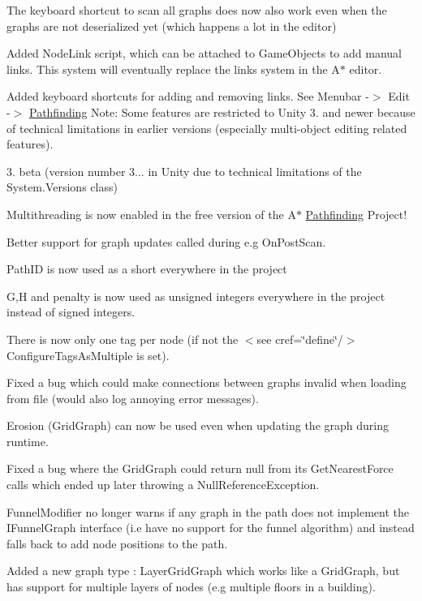 \begin{DoxyItemize}
\begin{DoxyItemize}
\item The keyboard shortcut to scan all graphs does now also work even when the graphs are not deserialized yet (which happens a lot in the editor)
\item Added Node\+Link script, which can be attached to Game\+Objects to add manual links. This system will eventually replace the links system in the A$\ast$ editor.
\item Added keyboard shortcuts for adding and removing links. See Menubar -\/$>$ Edit -\/$>$ \mbox{\hyperlink{namespace_pathfinding}{Pathfinding}} Note\+: Some features are restricted to Unity 3. and newer because of technical limitations in earlier versions (especially multi-\/object editing related features).
\end{DoxyItemize}
\item 3. beta (version number 3... in Unity due to technical limitations of the System.\+Versions class)
\begin{DoxyItemize}
\item Multithreading is now enabled in the free version of the A$\ast$ \mbox{\hyperlink{namespace_pathfinding}{Pathfinding}} Project!
\item Better support for graph updates called during e.\+g On\+Post\+Scan.
\item Path\+ID is now used as a short everywhere in the project
\item G,H and penalty is now used as unsigned integers everywhere in the project instead of signed integers.
\item There is now only one tag per node (if not the $<$see cref=\char`\"{}define\char`\"{}/$>$ Configure\+Tags\+As\+Multiple is set).
\item Fixed a bug which could make connections between graphs invalid when loading from file (would also log annoying error messages).
\item Erosion (Grid\+Graph) can now be used even when updating the graph during runtime.
\item Fixed a bug where the Grid\+Graph could return null from it\textquotesingle{}s Get\+Nearest\+Force calls which ended up later throwing a Null\+Reference\+Exception.
\item Funnel\+Modifier no longer warns if any graph in the path does not implement the I\+Funnel\+Graph interface (i.\+e have no support for the funnel algorithm) and instead falls back to add node positions to the path.
\item Added a new graph type \+: Layer\+Grid\+Graph which works like a Grid\+Graph, but has support for multiple layers of nodes (e.\+g multiple floors in a building).

\end{DoxyItemize}
\end{DoxyItemize}
